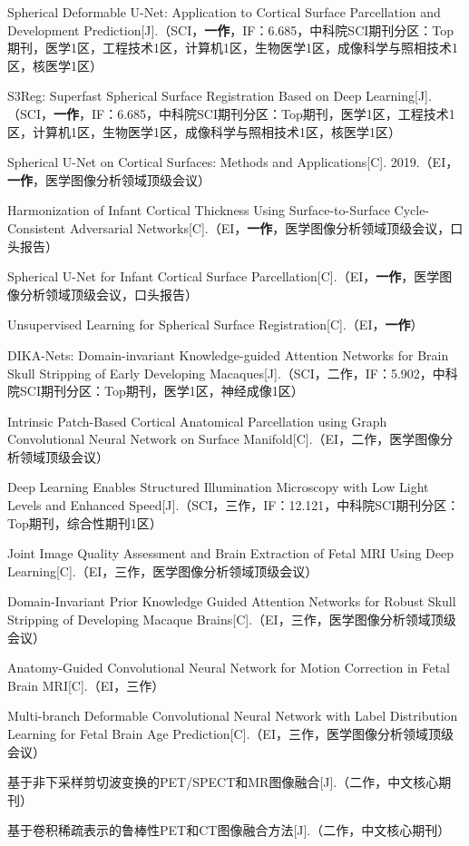         {
        \noindent [1] Spherical Deformable U-Net: Application to Cortical Surface Parcellation and Development Prediction[J].（SCI，\textbf{一作}，IF：6.685，中科院SCI期刊分区：Top期刊，医学1区，工程技术1区，计算机1区，生物医学1区，成像科学与照相技术1区，核医学1区）
        
        \noindent [2] S3Reg: Superfast Spherical Surface Registration Based on Deep Learning[J].（SCI，\textbf{一作}，IF：6.685，中科院SCI期刊分区：Top期刊，医学1区，工程技术1区，计算机1区，生物医学1区，成像科学与照相技术1区，核医学1区）
        
        \noindent [3] Spherical U-Net on Cortical Surfaces: Methods and Applications[C]. 2019.（EI，\textbf{一作}，医学图像分析领域顶级会议）
        
        \noindent [4] Harmonization of Infant Cortical Thickness Using Surface-to-Surface Cycle-Consistent Adversarial Networks[C].（EI，\textbf{一作}，医学图像分析领域顶级会议，口头报告）
        
        \noindent [5] Spherical U-Net for Infant Cortical Surface Parcellation[C].（EI，\textbf{一作}，医学图像分析领域顶级会议，口头报告）
        
        \noindent [6] Unsupervised Learning for Spherical Surface Registration[C].（EI，\textbf{一作}）
        
        \noindent [7] DIKA-Nets: Domain-invariant Knowledge-guided Attention Networks for Brain Skull Stripping of Early Developing Macaques[J].（SCI，二作，IF：5.902，中科院SCI期刊分区：Top期刊，医学1区，神经成像1区） 
        
        \noindent [8] Intrinsic Patch-Based Cortical Anatomical Parcellation using Graph Convolutional Neural Network on Surface Manifold[C].（EI，二作，医学图像分析领域顶级会议）
        
        \noindent [9] Deep Learning Enables Structured Illumination Microscopy with Low Light Levels and Enhanced Speed[J].（SCI，三作，IF：12.121，中科院SCI期刊分区：Top期刊，综合性期刊1区）
        
        \noindent [10] Joint Image Quality Assessment and Brain Extraction of Fetal MRI Using Deep Learning[C].（EI，三作，医学图像分析领域顶级会议）
        
        \noindent [11] Domain-Invariant Prior Knowledge Guided Attention Networks for Robust Skull Stripping of Developing Macaque Brains[C].（EI，三作，医学图像分析领域顶级会议）
        
        \noindent [12] Anatomy-Guided Convolutional Neural Network for Motion Correction in Fetal Brain MRI[C].（EI，三作）
        
        \noindent [13] Multi-branch Deformable Convolutional Neural Network with Label Distribution Learning for Fetal Brain Age Prediction[C].（EI，三作，医学图像分析领域顶级会议）
        
        \noindent [14] 基于非下采样剪切波变换的PET/SPECT和MR图像融合[J].（二作，中文核心期刊）
        
        \noindent [15] 基于卷积稀疏表示的鲁棒性PET和CT图像融合方法[J].（二作，中文核心期刊）
        }